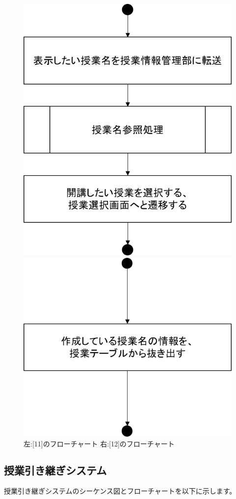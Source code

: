 \begin{figure}[htbp]
 \begin{minipage}{0.5\hsize}
  \begin{center}
   \includegraphics[width=0.5\linewidth,clip]{./img/create_lecture/sub11.png}
  \end{center}
 \end{minipage}
 \begin{minipage}{0.5\hsize}
  \begin{center}
   \includegraphics[width=0.5\linewidth,clip]{./img/create_lecture/sub12.png}
  \end{center}
 \end{minipage}
 \caption{左:[11]のフローチャート 右:[12]のフローチャート}\label{fig:createlectureflow5}
\end{figure}


\newpage
\subsection{授業引き継ぎシステム}
授業引き継ぎシステムのシーケンス図とフローチャートを以下に示します。

